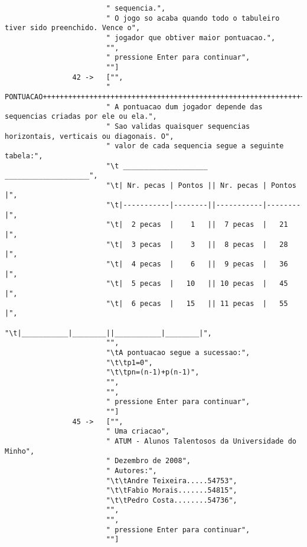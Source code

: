\documentclass[a4paper,titlepage]{scrreprt}
\begin{document}
\begin{verbatim}
						" sequencia.",
						" O jogo so acaba quando todo o tabuleiro tiver sido preenchido. Vence o",
						" jogador que obtiver maior pontuacao.",
						"",
						" pressione Enter para continuar",
						""]
				42 ->	["",
						" PONTUACAO++++++++++++++++++++++++++++++++++++++++++++++++++++++++++++++++",
						" A pontuacao dum jogador depende das sequencias criadas por ele ou ela.",
						" Sao validas quaisquer sequencias horizontais, verticais ou diagonais. O",
						" valor de cada sequencia segue a seguinte tabela:",
						"\t ____________________  ____________________",
						"\t| Nr. pecas | Pontos || Nr. pecas | Pontos |",
						"\t|-----------|--------||-----------|--------|",
						"\t|  2 pecas  |    1   ||  7 pecas  |   21   |",
						"\t|  3 pecas  |    3   ||  8 pecas  |   28   |",
						"\t|  4 pecas  |    6   ||  9 pecas  |   36   |",
						"\t|  5 pecas  |   10   || 10 pecas  |   45   |",
						"\t|  6 pecas  |   15   || 11 pecas  |   55   |",
						"\t|___________|________||___________|________|",
						"",
						"\tA pontuacao segue a sucessao:",
						"\t\tp1=0",
						"\t\tpn=(n-1)+p(n-1)",
						"",
						"",
						" pressione Enter para continuar",
						""]
				45 ->	["",
						" Uma criacao",
						" ATUM - Alunos Talentosos da Universidade do Minho",
						" Dezembro de 2008",
						" Autores:",
						"\t\tAndre Teixeira.....54753",
						"\t\tFabio Morais.......54815",
						"\t\tPedro Costa........54736",
						"",
						"",
						" pressione Enter para continuar",
						""]
	\end{verbatim}
\end{document}
